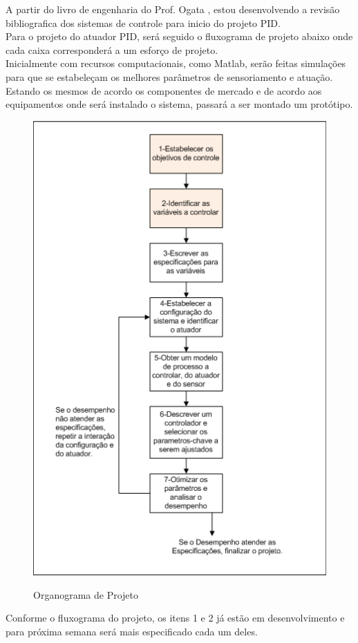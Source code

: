 A partir do livro de engenharia do Prof. Ogata \cite{ogata2003}, estou desenvolvendo a revisão bibliografica dos sistemas de controle para inicio do projeto PID.\\
Para o projeto do atuador PID, será seguido o fluxograma de projeto abaixo onde cada caixa corresponderá a um esforço de projeto.\\
Inicialmente com recursos computacionais, como Matlab, serão feitas simulações para que se estabeleçam os melhores parâmetros de sensoriamento e atuação.\\
Estando os mesmos de acordo os componentes de mercado e de acordo aos equipamentos onde será instalado o sistema, passará a ser montado um protótipo.\\
\justifying
	\begin{figure}
		\centering
		\includegraphics[width=0.7\linewidth]{./ima/fluxo1.png}
		\label{fig:fluxo1}
		\caption{Organograma de Projeto}
	\end{figure}
	
Conforme o fluxograma do projeto, os itens 1 e 2 já estão em desenvolvimento e para próxima semana será mais especificado cada um deles. \\
